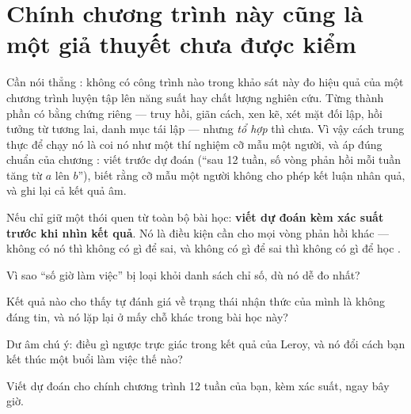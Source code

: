 \documentclass[../hieu-suat.tex]{subfiles}
\begin{document}
\section{Chính chương trình này cũng là một giả thuyết chưa được kiểm}

Cần nói thẳng \nM{}: không có công trình nào trong khảo sát này đo hiệu quả của một chương trình luyện tập lên năng suất hay chất lượng nghiên cứu. Từng thành phần có bằng chứng riêng --- truy hồi, giãn cách, xen kẽ, xét mặt đối lập, hồi tưởng từ tương lai, danh mục tái lập --- nhưng \emph{tổ hợp} thì chưa. Vì vậy cách trung thực để chạy nó là coi nó như một thí nghiệm cỡ mẫu một người, và áp đúng chuẩn của chương : viết trước dự đoán (``sau 12 tuần, số vòng phản hồi mỗi tuần tăng từ \(a\) lên \(b\)''), biết rằng cỡ mẫu một người không cho phép kết luận nhân quả, và ghi lại cả kết quả âm.

\begin{cannho}
Nếu chỉ giữ một thói quen từ toàn bộ bài học: \textbf{viết dự đoán kèm xác suất trước khi nhìn kết quả}. Nó là điều kiện cần cho mọi vòng phản hồi khác --- không có nó thì không có gì để sai, và không có gì để sai thì không có gì để học \nM{}.
\end{cannho}

\begin{traloi}
\end{traloi}

\begin{tukiem}
\item Vì sao ``số giờ làm việc'' bị loại khỏi danh sách chỉ số, dù nó dễ đo nhất?
\item Kết quả nào cho thấy tự đánh giá về trạng thái nhận thức của mình là không đáng tin, và nó lặp lại ở mấy chỗ khác trong bài học này?
\item Dư âm chú ý: điều gì ngược trực giác trong kết quả của Leroy, và nó đổi cách bạn kết thúc một buổi làm việc thế nào?
\item Viết dự đoán cho chính chương trình 12 tuần của bạn, kèm xác suất, ngay bây giờ.
\end{tukiem}
\end{document}
